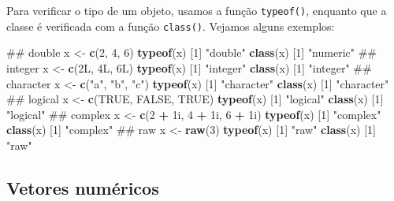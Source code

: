 \documentclass[10pt,a4paper]{book}
\newenvironment{Shaded}{\begin{snugshade}}{\end{snugshade}}
\newcommand{\KeywordTok}[1]{\textcolor[rgb]{0.13,0.29,0.53}{\textbf{#1}}}
\newcommand{\DecValTok}[1]{\textcolor[rgb]{0.00,0.00,0.81}{#1}}
\newcommand{\StringTok}[1]{\textcolor[rgb]{0.31,0.60,0.02}{#1}}
\newcommand{\OtherTok}[1]{\textcolor[rgb]{0.56,0.35,0.01}{#1}}
\newcommand{\OperatorTok}[1]{\textcolor[rgb]{0.81,0.36,0.00}{\textbf{#1}}}
\newcommand{\NormalTok}[1]{#1}
\begin{document}
Para verificar o tipo de um objeto, usamos a função \texttt{typeof()},
enquanto que a classe é verificada com a função \texttt{class()}.
Vejamos alguns exemplos:

\begin{Shaded}
\begin{Highlighting}[]
\NormalTok{## double}
\NormalTok{x <-}\StringTok{ }\KeywordTok{c}\NormalTok{(}\DecValTok{2}\NormalTok{, }\DecValTok{4}\NormalTok{, }\DecValTok{6}\NormalTok{)}
\KeywordTok{typeof}\NormalTok{(x)}
\NormalTok{[}\DecValTok{1}\NormalTok{] }\StringTok{"double"}
\KeywordTok{class}\NormalTok{(x)}
\NormalTok{[}\DecValTok{1}\NormalTok{] }\StringTok{"numeric"}
\NormalTok{## integer}
\NormalTok{x <-}\StringTok{ }\KeywordTok{c}\NormalTok{(2L, 4L, 6L)}
\KeywordTok{typeof}\NormalTok{(x)}
\NormalTok{[}\DecValTok{1}\NormalTok{] }\StringTok{"integer"}
\KeywordTok{class}\NormalTok{(x)}
\NormalTok{[}\DecValTok{1}\NormalTok{] }\StringTok{"integer"}
\NormalTok{## character}
\NormalTok{x <-}\StringTok{ }\KeywordTok{c}\NormalTok{(}\StringTok{"a"}\NormalTok{, }\StringTok{"b"}\NormalTok{, }\StringTok{"c"}\NormalTok{)}
\KeywordTok{typeof}\NormalTok{(x)}
\NormalTok{[}\DecValTok{1}\NormalTok{] }\StringTok{"character"}
\KeywordTok{class}\NormalTok{(x)}
\NormalTok{[}\DecValTok{1}\NormalTok{] }\StringTok{"character"}
\NormalTok{## logical}
\NormalTok{x <-}\StringTok{ }\KeywordTok{c}\NormalTok{(}\OtherTok{TRUE}\NormalTok{, }\OtherTok{FALSE}\NormalTok{, }\OtherTok{TRUE}\NormalTok{)}
\KeywordTok{typeof}\NormalTok{(x)}
\NormalTok{[}\DecValTok{1}\NormalTok{] }\StringTok{"logical"}
\KeywordTok{class}\NormalTok{(x)}
\NormalTok{[}\DecValTok{1}\NormalTok{] }\StringTok{"logical"}
\NormalTok{## complex}
\NormalTok{x <-}\StringTok{ }\KeywordTok{c}\NormalTok{(}\DecValTok{2} \OperatorTok{+}\StringTok{ }\NormalTok{1i, }\DecValTok{4} \OperatorTok{+}\StringTok{ }\NormalTok{1i, }\DecValTok{6} \OperatorTok{+}\StringTok{ }\NormalTok{1i)}
\KeywordTok{typeof}\NormalTok{(x)}
\NormalTok{[}\DecValTok{1}\NormalTok{] }\StringTok{"complex"}
\KeywordTok{class}\NormalTok{(x)}
\NormalTok{[}\DecValTok{1}\NormalTok{] }\StringTok{"complex"}
\NormalTok{## raw}
\NormalTok{x <-}\StringTok{ }\KeywordTok{raw}\NormalTok{(}\DecValTok{3}\NormalTok{)}
\KeywordTok{typeof}\NormalTok{(x)}
\NormalTok{[}\DecValTok{1}\NormalTok{] }\StringTok{"raw"}
\KeywordTok{class}\NormalTok{(x)}
\NormalTok{[}\DecValTok{1}\NormalTok{] }\StringTok{"raw"}
\end{Highlighting}
\end{Shaded}

\subsection{Vetores numéricos}\label{vetores-numuxe9ricos}
\end{document}
